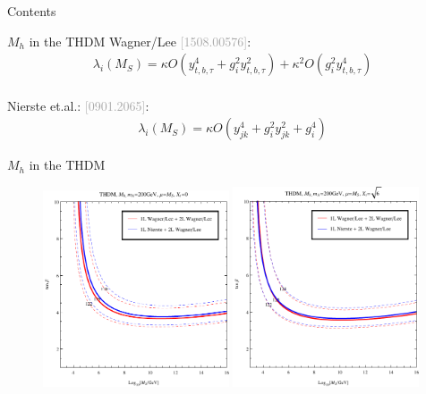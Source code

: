 \documentclass[hyperref={pdfpagelabels=false},ngerman]{beamer}
\newcommand{\bigcite}[1]{\textcolor{darkgray}{[#1]}}
\begin{document}
\begin{frame}{Contents}
  \tableofcontents[currentsection]  
\end{frame}

\begin{frame}{$M_h$ in the THDM}
  Wagner/Lee \bigcite{1508.00576}:\\
  \begin{align*}
    \lambda_i(M_S) = \kappa O(y_{t,b,\tau}^4 + g_i^2 y_{t,b,\tau}^2)
    + \kappa^2 O(g_i^2 y_{t,b,\tau}^4)
  \end{align*}
  \\[1em]
  Nierste et.al.: \bigcite{0901.2065}:\\
  \begin{align*}
    \lambda_i(M_S) = \kappa O(y_{jk}^4 + g_i^2 y_{jk}^2 + g_i^4)
  \end{align*}
\end{frame}

\begin{frame}{$M_h$ in the THDM}
  \begin{figure}
    \centering
    \includegraphics[width=0.49\textwidth]{plots/THDM/THDMIIMSSMBC_Xt-0_combined}
    \includegraphics[width=0.49\textwidth]{plots/THDM/THDMIIMSSMBC_Xt-Sqrt[6]_combined}
  \end{figure}
\end{frame}
\end{document}
